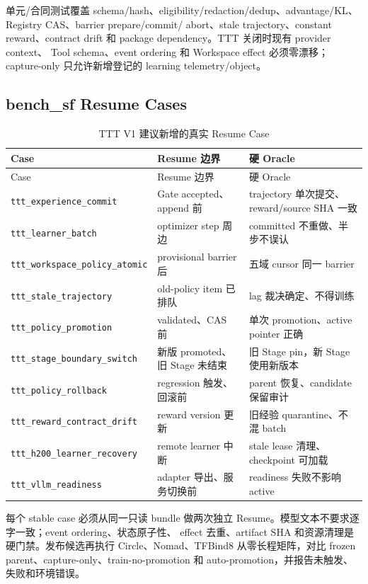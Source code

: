 \documentclass[UTF8,11pt,a4paper]{ctexart}
\begin{document}
单元/合同测试覆盖 schema/hash、eligibility/redaction/dedup、advantage/KL、Registry CAS、barrier prepare/commit/
abort、stale trajectory、constant reward、contract drift 和 package dependency。TTT 关闭时现有 provider context、
Tool schema、event ordering 和 Workspace effect 必须零漂移；capture-only 只允许新增登记的 learning telemetry/object。

\subsection{bench\_sf Resume Cases}

\begin{longtable}{L{4.0cm}L{4.4cm}L{5.4cm}}
  \caption{TTT V1 建议新增的真实 Resume Case}\label{tab:bench}\\
  \toprule
  Case & Resume 边界 & 硬 Oracle \\
  \midrule
  \endfirsthead
  \toprule
  Case & Resume 边界 & 硬 Oracle \\
  \midrule
  \endhead
  \nolinkurl{ttt_experience_commit} & Gate accepted、append 前 & trajectory 单次提交、reward/source SHA 一致 \\
  \nolinkurl{ttt_learner_batch} & optimizer step 周边 & committed 不重做、半步不误认 \\
  \nolinkurl{ttt_workspace_policy_atomic} & provisional barrier 后 & 五域 cursor 同一 barrier \\
  \nolinkurl{ttt_stale_trajectory} & old-policy item 已排队 & lag 裁决确定、不得训练 \\
  \nolinkurl{ttt_policy_promotion} & validated、CAS 前 & 单次 promotion、active pointer 正确 \\
  \nolinkurl{ttt_stage_boundary_switch} & 新版 promoted、旧 Stage 未结束 & 旧 Stage pin，新 Stage 使用新版本 \\
  \nolinkurl{ttt_policy_rollback} & regression 触发、回滚前 & parent 恢复、candidate 保留审计 \\
  \nolinkurl{ttt_reward_contract_drift} & reward version 更新 & 旧经验 quarantine、不混 batch \\
  \nolinkurl{ttt_h200_learner_recovery} & remote learner 中断 & stale lease 清理、checkpoint 可加载 \\
  \nolinkurl{ttt_vllm_readiness} & adapter 导出、服务切换前 & readiness 失败不影响 active \\
  \bottomrule
\end{longtable}

每个 stable case 必须从同一只读 bundle 做两次独立 Resume。模型文本不要求逐字一致；event ordering、状态原子性、
effect 去重、artifact SHA 和资源清理是硬门禁。发布候选再执行 Circle、Nomad、TFBind8 从零长程矩阵，对比
frozen parent、capture-only、train-no-promotion 和 auto-promotion，并报告未触发、失败和环境错误。
\end{document}
